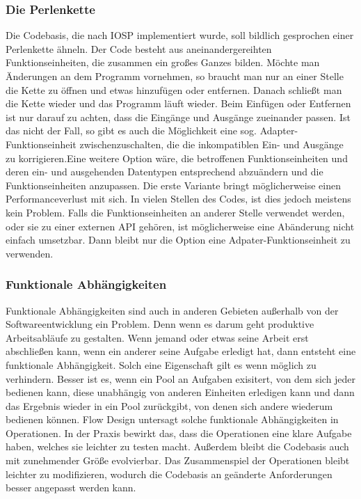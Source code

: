 \subsubsection{Die Perlenkette}

Die Codebasis, die nach IOSP implementiert wurde, soll bildlich gesprochen einer
Perlenkette ähneln. Der Code besteht aus aneinandergereihten Funktionseinheiten,
die zusammen ein großes Ganzes bilden. Möchte man Änderungen an dem Programm
vornehmen, so braucht man nur an einer Stelle die Kette zu öffnen und etwas
hinzufügen oder entfernen. Danach schließt man die Kette wieder und das Programm
läuft wieder. Beim Einfügen oder Entfernen ist nur darauf zu achten, dass die
Eingänge und Ausgänge zueinander passen. Ist das nicht der Fall, so gibt es auch
die Möglichkeit eine sog. Adapter-Funktionseinheit zwischenzuschalten, die die inkompatiblen
Ein- und Ausgänge zu korrigieren.Eine weitere Option wäre, die betroffenen
Funktionseinheiten und deren
ein- und ausgehenden Datentypen entsprechend abzuändern und die
Funktionseinheiten anzupassen.
Die erste Variante bringt möglicherweise einen Performanceverlust mit sich.
In vielen Stellen des Codes, ist dies jedoch meistens kein Problem.
Falls die Funktionseinheiten an anderer Stelle verwendet werden, oder sie zu
einer externen API gehören, ist möglicherweise eine Abänderung nicht
einfach umsetzbar. Dann bleibt nur die Option eine Adpater-Funktionseinheit zu verwenden.

\subsubsection{Funktionale Abhängigkeiten}

Funktionale Abhängigkeiten sind auch in anderen Gebieten außerhalb von der
Softwareentwicklung ein Problem. Denn wenn es darum geht produktive
Arbeitsabläufe zu gestalten.
Wenn jemand oder etwas seine Arbeit erst abschließen kann, wenn ein anderer
seine Aufgabe erledigt hat, dann entsteht eine funktionale Abhängigkeit.
Solch eine Eigenschaft gilt es wenn möglich zu verhindern.
Besser ist es, wenn ein Pool an Aufgaben exisitert, von dem sich jeder bedienen kann,
diese unabhängig von anderen Einheiten erledigen kann und dann das Ergebnis wieder
in ein Pool zurückgibt, von denen sich andere wiederum bedienen können.
Flow Design untersagt solche funktionale Abhängigkeiten in Operationen.
In der Praxis bewirkt das, dass die Operationen eine klare Aufgabe haben, welches
sie leichter zu testen macht.
Außerdem bleibt die Codebasis auch mit zunehmender Größe evolvierbar. Das
Zusammenspiel der Operationen bleibt leichter zu modifizieren, wodurch die
Codebasis an geänderte Anforderungen besser angepasst werden kann.

